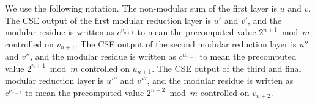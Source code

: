 \documentclass[twoside]{article}
\begin{document}
\begin{center}
\begin{figure}[h!tb]
\begin{displaymath}
\end{displaymath}
\label{fig:csa-proof}
\end{figure}
\end{center}

We use the following notation.
The non-modular sum of the first layer is $u$ and $v$.
The CSE output of the first modular reduction layer
is $u'$ and $v'$, and the modular residue is
written as $c^{v_{n+1}}$ to mean the precomputed value $2^{n+1} \bmod m$
controlled on $v_{n+1}$.
The CSE output of the second modular reduction layer
is $u''$ and $v''$, and the modular residue is written as
$c^{u_{n+1}}$ to mean the precomputed value $2^{n+1} \bmod m$
controlled on $u_{n+1}$.
The CSE output of the third and final modular reduction layer
is $u'''$ and $v'''$, and the modular residue is written as
$c^{v_{n+2}}$ to mean the precomputed value $2^{n+2} \bmod m$
controlled on $v_{n+2}$.
\end{document}
